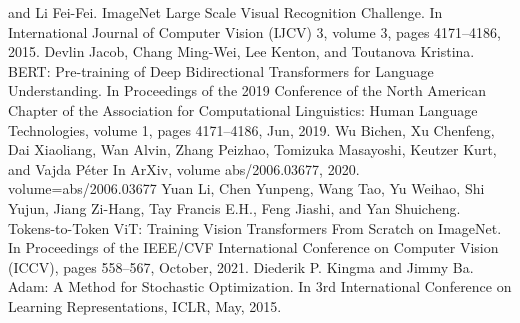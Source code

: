 \begin{thebibliography}{9}
  and Li Fei-Fei.
  ImageNet Large Scale Visual Recognition Challenge.
  In International Journal of Computer Vision (IJCV) 3, volume 3, pages 4171--4186, 2015.
  Devlin Jacob, Chang Ming-Wei, Lee Kenton, and Toutanova Kristina.
  BERT: Pre-training of Deep Bidirectional Transformers for Language Understanding.
  In Proceedings of the 2019 Conference of the North American Chapter
  of the Association for Computational Linguistics: Human Language Technologies,
  volume 1, pages 4171--4186, Jun, 2019.
  Wu Bichen, Xu Chenfeng, Dai Xiaoliang, Wan Alvin, Zhang Peizhao, Tomizuka Masayoshi,
  Keutzer Kurt, and Vajda P{\'e}ter
  In ArXiv, volume abs/2006.03677, 2020.
  volume={abs/2006.03677}
  Yuan Li, Chen Yunpeng, Wang Tao, Yu Weihao, Shi Yujun, Jiang Zi-Hang, Tay Francis E.H., 
  Feng Jiashi, and Yan Shuicheng.
  Tokens-to-Token ViT: Training Vision Transformers From Scratch on ImageNet.
  In Proceedings of the IEEE/CVF International Conference on Computer Vision (ICCV),
  pages 558--567, October, 2021.
  Diederik P. Kingma and Jimmy Ba.
  Adam: {A} Method for Stochastic Optimization.
  In 3rd International Conference on Learning Representations, {ICLR}, May, 2015.
\end{thebibliography}

